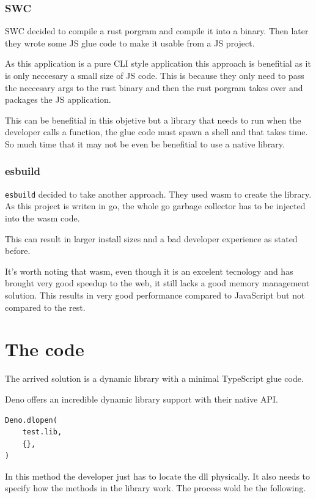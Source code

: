 \documentclass[12pt, letterpaper]{article}
\begin{document}
\begin{multicols}{2}
    \subsubsection{SWC}

    SWC decided to compile a rust porgram and compile it into a binary. Then later they wrote some JS glue code to make it usable from a JS project.

    As this application is a pure CLI style application this approach is benefitial as it is only neccesary a small size of JS code. This is because they only need to pass the neccesary args to the rust binary and then the rust porgram takes over and packages the JS application.

    This can be benefitial in this objetive but a library that needs to run when the developer calls a function, the glue code must spawn a shell and that takes time. So much time that it may not be even be benefitial to use a native library.

    \subsubsection{esbuild}

    \verb|esbuild| decided to take another approach. They used wasm to create the library. As this project is writen in go, the whole go garbage collector has to be injected into the wasm code.

    This can result in larger install sizes and a bad developer experience as stated before.

    It's worth noting that wasm, even though it is an excelent tecnology and has brought very good speedup to the web, it still lacks a good memory management solution. This results in very good performance compared to JavaScript but not compared to the rest.

    \section{The code}

    The arrived solution is a dynamic library with a minimal TypeScript glue code.

    Deno offers an incredible dynamic library support with their native API.

    \begin{lstlisting}
Deno.dlopen(
    test.lib,
    {},
)
    \end{lstlisting}

    In this method the developer just has to locate the dll physically. It also needs to specify how the methods in the library work.
    The process wold be the following.


\end{multicols}
\end{document}
